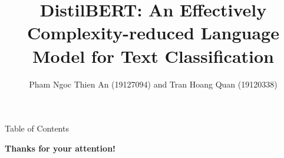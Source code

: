 \documentclass[10pt, aspectratio=149]{beamer}
\title[DistilBERT for Text Classification]{DistilBERT: An Effectively Complexity-reduced Language Model for Text Classification}
\author[PNTAn and THQuan]{Pham Ngoc Thien An (19127094) and Tran Hoang Quan (19120338)}
\institute[fit@hcmus]{VNUHCM - University of Science}
\begin{document}
\maketitle

\begin{frame}{Table of Contents}
\tableofcontents
\end{frame}









\begin{frame}[plain]
\centering
\Huge{\textbf{Thanks for your attention!}}
\end{frame}
\end{document}
